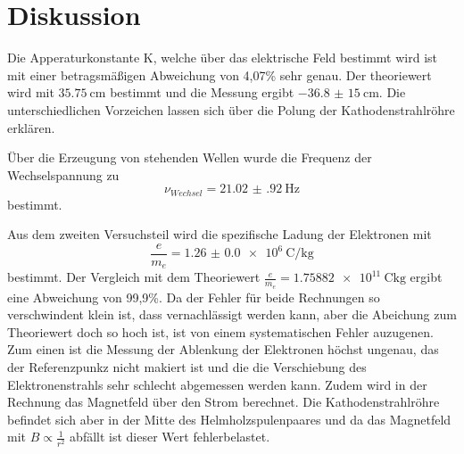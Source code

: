 \section{Diskussion}
\label{sec:Diskussion}
Die Apperaturkonstante K, welche über das elektrische Feld bestimmt wird ist mit einer
betragsmäßigen Abweichung von 4,07\% sehr genau. Der theoriewert wird mit
$\SI{35,75}{\cm}$ bestimmt und die Messung
ergibt $\SI{-36,8(15)}{\cm}$. Die unterschiedlichen Vorzeichen lassen sich über die
Polung der Kathodenstrahlröhre erklären.

Über die Erzeugung von stehenden Wellen wurde die Frequenz der Wechselspannung
zu
\begin{equation*}
  \nu_{Wechsel}=\SI{21.02(92)}{\Hz}
\end{equation*}
bestimmt.

Aus dem zweiten Versuchsteil wird die spezifische Ladung der Elektronen mit
\begin{equation*}
  \frac{e}{m_e}=\SI{1.26(0)e6}{\coulomb\per\kg}
\end{equation*}
bestimmt. Der Vergleich mit dem Theoriewert
$\frac{e}{m_e}=\SI{1,75882e11}{\coulomb\kg}$ \cite{em}
ergibt eine Abweichung von 99,9\%.
Da der Fehler für beide Rechnungen so verschwindent klein ist, dass vernachlässigt werden
kann, aber die Abeichung zum Theoriewert doch so hoch ist, ist von einem
systematischen Fehler auzugenen. Zum einen ist die Messung der Ablenkung der Elektronen
höchst ungenau, das der Referenzpunkz nicht makiert ist und die die Verschiebung des
Elektronenstrahls sehr schlecht abgemessen werden kann. Zudem wird in der Rechnung das Magnetfeld
über den Strom berechnet. Die Kathodenstrahlröhre befindet sich aber in der Mitte des
Helmholzspulenpaares und da das Magnetfeld mit $B\propto\frac{1}{r^{2}}$ abfällt
ist dieser Wert fehlerbelastet.
